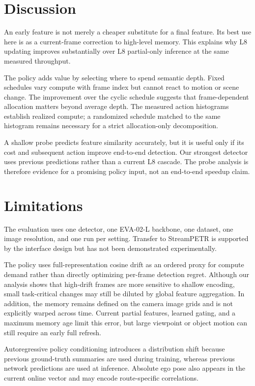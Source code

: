 \documentclass[10pt,twocolumn,letterpaper]{article}
\begin{document}
\section{Discussion}

An early feature is not merely a cheaper substitute for a final feature. Its best use here is as a current-frame correction to high-level memory. This explains why L8 updating improves substantially over L8 partial-only inference at the same measured throughput.

The policy adds value by selecting where to spend semantic depth. Fixed schedules vary compute with frame index but cannot react to motion or scene change. The improvement over the cyclic schedule suggests that frame-dependent allocation matters beyond average depth. The measured action histograms establish realized compute; a randomized schedule matched to the same histogram remains necessary for a strict allocation-only decomposition.

A shallow probe predicts feature similarity accurately, but it is useful only if its cost and subsequent action improve end-to-end detection. Our strongest detector uses previous predictions rather than a current L8 cascade. The probe analysis is therefore evidence for a promising policy input, not an end-to-end speedup claim.

\section{Limitations}

The evaluation uses one detector, one EVA-02-L backbone, one dataset, one image resolution, and one run per setting. Transfer to StreamPETR is supported by the interface design but has not been demonstrated experimentally.

The policy uses full-representation cosine drift as an ordered proxy
for compute demand rather than directly optimizing per-frame
detection regret. Although our analysis shows that high-drift frames
are more sensitive to shallow encoding, small task-critical changes
may still be diluted by global feature aggregation. In addition, the
memory remains defined on the camera image grids and is not explicitly
warped across time. Current partial features, learned gating, and a
maximum memory age limit this error, but large viewpoint or object
motion can still require an early full refresh.

Autoregressive policy conditioning introduces a distribution shift because previous ground-truth summaries are used during training, whereas previous network predictions are used at inference. Absolute ego pose also appears in the current online vector and may encode route-specific correlations.
\end{document}

